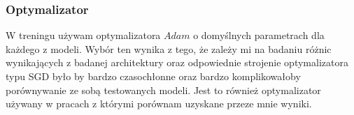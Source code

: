 \subsubsection{Optymalizator}
W treningu używam optymalizatora \begin{math}Adam\end{math} o domyślnych parametrach dla każdego z modeli.
Wybór ten wynika z tego, że zależy mi na badaniu różnic wynikających z badanej architektury oraz odpowiednie strojenie optymalizatora typu SGD
było by bardzo czasochłonne oraz bardzo komplikowałoby porównywanie ze sobą testowanych modeli. Jest to również optymalizator używany w pracach 
z którymi porównam uzyskane przeze mnie wyniki.  

